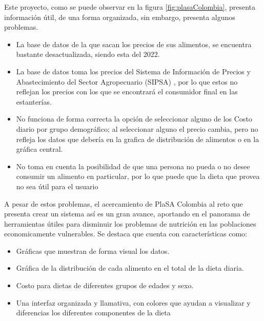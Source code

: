 Este proyecto, como se puede observar en la figura \ref{fig:plasaColombia}, presenta informaci\'on \'util, de una forma organizada, sin embargo, presenta algunos problemas.

\begin{itemize}
    \item La base de datos de la que sacan los precios de sus alimentos, se encuentra bastante desactualizada, siendo esta del 2022.
    \item La base de datos toma los precios del Sistema de Informaci\'on de Precios y Abastecimiento del Sector Agropecuario (SIPSA) , por lo que estos no reflejan los precios con los que se encontrar\'a el consumidor final en las estanter\'ias.
    \item No funciona de forma correcta la opci\'on de seleccionar alguno de los Costo diario por grupo demogr\'afico; al seleccionar alguno el precio cambia, pero no refleja los datos que deber\'ia en la grafica de distribuci\'on de alimentos o en la gr\'afica central.
    \item No toma en cuenta la posibilidad de que una persona no pueda o no desee consumir un alimento en particular, por lo que puede que la dieta que provea no sea \'util para el usuario
\end{itemize}

A pesar de estos problemas, el acercamiento de PlaSA Colombia al reto que presenta crear un sistema as\'i es un gran avance, aportando en el panorama de herramientas \'utiles para disminuir los problemas de nutrici\'on en las poblaciones economicamente vulnerables. Se destaca que cuenta con caracter\'isticas como:

\begin{itemize}
    \item Gr\'aficas que muestran de forma visual los datos.
    \item Gr\'afica de la distribuci\'on de cada alimento en el total de la dieta diaria.
    \item Costo para dietas de diferentes grupos de edades y sexo.
    \item Una interfaz organizada y llamativa, con colores que ayudan a visualizar y diferencias los diferentes componentes de la dieta
\end{itemize}

